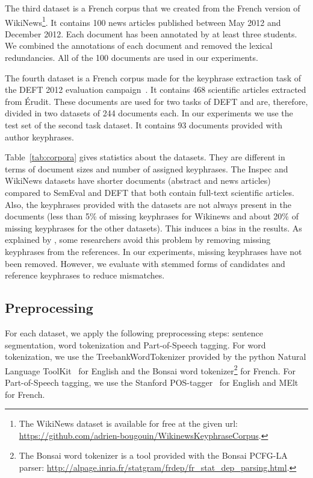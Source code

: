     The third dataset is a French corpus that we created from the French version
    of WikiNews\footnote{The WikiNews dataset is available for free at the given
    url: \url{https://github.com/adrien-bougouin/WikinewsKeyphraseCorpus}.}. It
    contains 100 news articles published between May 2012 and December 2012.
    Each document has been annotated by at least three students. We combined the
    annotations of each document and removed the lexical redundancies. All of
    the 100 documents are used in our experiments.

    The fourth dataset is a French corpus made for the keyphrase extraction task
    of the DEFT 2012 evaluation campaign~\cite{paroubek2012deft}. It contains
    468 scientific articles extracted from Érudit. These documents are used for
    two tasks of DEFT and are, therefore, divided in two datasets of 244
    documents each. In our experiments we use the test set of the second task
    dataset. It contains 93 documents provided with author keyphrases.

    Table~\ref{tab:corpora} gives statistics about the datasets. They are
    different in terms of document sizes and number of assigned keyphrases. The
    Inspec and WikiNews datasets have shorter documents (abstract and news
    articles) compared to SemEval and DEFT that both contain full-text
    scientific articles. Also, the keyphrases provided with the datasets are not
    always present in the documents (less than 5\% of missing keyphrases for
    Wikinews and about 20\% of missing keyphrases for the other datasets). This
    induces a bias in the results. As explained by
    , some researchers avoid this problem by
    removing missing keyphrases from the references. In our experiments, missing
    keyphrases have not been removed. However, we evaluate with stemmed forms of
    candidates and reference keyphrases to reduce mismatches.

  \subsection{Preprocessing}
  \label{subsec:pre_processing}
    For each dataset, we apply the following preprocessing steps: sentence
    segmentation, word tokenization and Part-of-Speech tagging. For word
    tokenization, we use the TreebankWordTokenizer provided by the python
    Natural Language ToolKit~\cite{bird2009nltk} for English and the Bonsai word
    tokenizer\footnote{The Bonsai word tokenizer is a tool provided with the
    Bonsai PCFG-LA parser:
    \url{http://alpage.inria.fr/statgram/frdep/fr_stat_dep_parsing.html}.} for
    French. For Part-of-Speech tagging, we use the Stanford
    POS-tagger~\cite{toutanova2003stanfordpostagger} for English and
    MElt~\cite{denis2009melt} for French.

